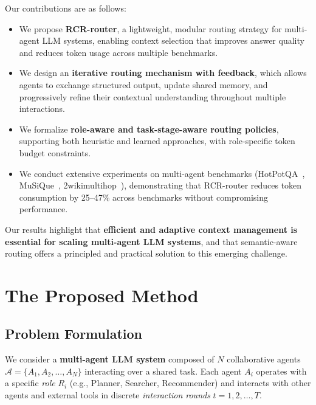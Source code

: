 \documentclass[letterpaper]{article} %
\begin{document}
Our contributions are as follows:

\begin{itemize}
    \item We propose \textbf{RCR-router}, a lightweight, modular routing strategy for multi-agent LLM systems, enabling context selection that improves answer quality and reduces token usage across multiple benchmarks.
    \item  We design an \textbf{iterative routing mechanism with feedback}, which allows agents to exchange structured output, update shared memory, and progressively refine their contextual understanding throughout multiple interactions.
    \item We formalize \textbf{role-aware and task-stage-aware routing policies}, supporting both heuristic and learned approaches, with role-specific token budget constraints.
    \item We conduct extensive experiments on multi-agent benchmarks (HotPotQA~\cite{yang2018hotpotqa}, MuSiQue~\cite{trivedi2022musique}, 2wikimultihop~\cite{xanh2020_2wikimultihop}), demonstrating that RCR-router reduces token consumption by 25–47\% across benchmarks without compromising performance.
\end{itemize}

Our results highlight that \textbf{efficient and adaptive context management is essential for scaling multi-agent LLM systems}, and that semantic-aware routing offers a principled and practical solution to this emerging challenge.




\section{The Proposed Method}
\subsection{Problem Formulation}
We consider a \textbf{multi-agent LLM system} composed of $N$ collaborative agents $\mathcal{A} = \{ A_1, A_2, \dots, A_N \}$ interacting over a shared task. Each agent $A_i$ operates with a specific \textit{role} $R_i$ (e.g., Planner,  Searcher, Recommender) and interacts with other agents and external tools in discrete \textit{interaction rounds} $t = 1, 2, \dots, T$.
\end{document}
